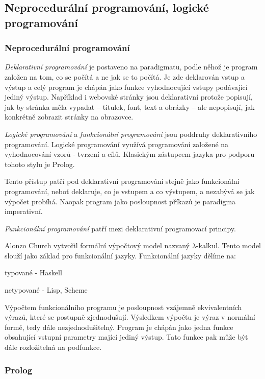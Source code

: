 \subsection{Neprocedurální programování, logické programování}

\subsubsection*{Neprocedurální programování}
\emph{Deklarativní programování} je postaveno na paradigmatu, podle něhož je program založen na tom, co se počítá a ne jak se to počítá. Je zde deklarován vstup a výstup a celý program je chápán jako funkce vyhodnocující vstupy podávající jediný výstup. Například i webovské stránky jsou deklarativní protože popisují, jak by stránka měla vypadat -- titulek, font, text a obrázky -- ale nepopisují, jak konkrétně zobrazit stránky na obrazovce.

\emph{Logické programování} a \emph{funkcionální programování} jsou poddruhy deklarativního programování. Logické programování využívá programování založené na vyhodnocování vzorů - tvrzení a cílů. Klasickým zástupcem jazyka pro podporu tohoto stylu je Prolog.

Tento přístup patří pod deklarativní programování stejně jako funkcionální programování, neboť deklaruje, co je vstupem a co výstupem, a nezabývá se jak výpočet probíhá. Naopak program jako posloupnost příkazů je paradigma imperativní.

\emph{Funkcionální programování} patří mezi deklarativní programovací principy.

Alonzo Church vytvořil formální výpočtový model nazvaný $\lambda$-kalkul. Tento model slouží jako základ pro funkcionální jazyky. Funkcionální jazyky dělíme na:
\begin{pitemize}
	\item typované - Haskell
	\item netypované - Lisp, Scheme
\end{pitemize}

Výpočtem funkcionálního programu je posloupnost vzájemně ekvivalentních výrazů, které se postupně zjednodušují. Výsledkem výpočtu je výraz v normální formě, tedy dále nezjednodušitelný. Program je chápán jako jedna funkce obsahující vstupní parametry mající jediný výstup. Tato funkce pak může být dále rozložitelná na podfunkce.

\subsubsection*{Prolog}

